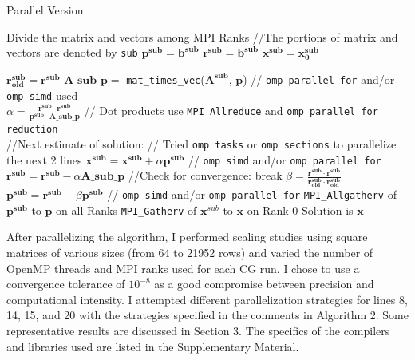 \documentclass{article}
\begin{document}
\begin{algorithm}[H]
	\begin{algorithmic}[1]
		\caption{Parallel Version}
		\State Divide the matrix and vectors among MPI Ranks
		\State //The portions of matrix and vectors are denoted by \texttt{sub}
		\State $\mathbf{p^{sub}} = \mathbf{b^{sub}}$
		\State $\mathbf{r^{sub}} = \mathbf{b^{sub}}$
		\State $\mathbf{x^{sub}} = \mathbf{x^{sub}_0}$
		
		\State $\mathbf{r^{sub}_{old}} = \mathbf{r^{sub}}$
		\State $\mathbf{A\_sub\_p} =$ \texttt{mat\_times\_vec}($\mathbf{A^{sub}}$, $\mathbf{p}$)  // \texttt{omp parallel for} and/or \texttt{omp simd} used \\
		\State $\alpha = \frac{\mathbf{r^{sub}} \cdot \mathbf{r^{sub}}}{\mathbf{p^{sub}} \cdot \mathbf{A\_sub\_p} }$  // Dot products use \texttt{MPI\_Allreduce} and \texttt{omp parallel for reduction} \\
		\State //Next estimate of solution:
		\State // Tried \texttt{omp tasks} or \texttt{omp sections} to parallelize the next 2 lines
		\State $\mathbf{x^{sub}} = \mathbf{x^{sub}} + \alpha \mathbf{p^{sub}}$ // \texttt{omp simd} and/or \texttt{omp parallel for}
		\State $\mathbf{r^{sub}} = \mathbf{r^{sub}} - \alpha \mathbf{A\_sub\_p}$
		\State //Check for convergence:
		\State break
		\EndIf
		\State $\beta = \frac{\mathbf{r^{sub}} \cdot \mathbf{r^{sub}}}{\mathbf{r^{sub}_{old}} \cdot \mathbf{r^{sub}_{old}}}$
		\State $\mathbf{p^{sub}} = \mathbf{r^{sub}} + \beta \mathbf{p^{sub}}$ // \texttt{omp simd} and/or \texttt{omp parallel for}
		\State \texttt{MPI\_Allgatherv} of $\mathbf{p^{sub}}$ to $\mathbf{p}$ on all Ranks
		\EndFor
		\State \texttt{MPI\_Gatherv} of $\mathbf{x}^{sub}$ to $\mathbf{x}$ on Rank 0
		\State Solution is $\mathbf{x}$
	\end{algorithmic}
\end{algorithm}

After parallelizing the algorithm, I performed scaling studies using square matrices of various sizes (from 64 to 21952 rows) and varied the number of OpenMP threads and MPI ranks used for each CG run. I chose to use a convergence tolerance of $10^{-8}$ as a good compromise between precision and computational intensity. I attempted different parallelization strategies for lines 8, 14, 15, and 20 with the strategies specified in the comments in Algorithm 2. Some representative results are discussed in Section 3. The specifics of the compilers and libraries used are listed in the Supplementary Material.
\end{document}
